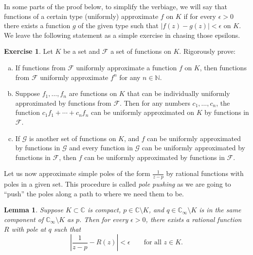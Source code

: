 \documentclass[12pt,openany]{book}
\newcommand{\sabs}[1]{\lvert {#1} \rvert}
\newcommand{\abs}[1]{\left\lvert {#1} \right\rvert}
\newcommand{\C}{{\mathbb{C}}}
\newcommand{\N}{{\mathbb{N}}}
\newcommand{\sF}{{\mathscr{F}}}
\newcommand{\sG}{{\mathscr{G}}}
\newcommand{\myindex}[1]{#1\index{#1}}
\newcommand{\myquote}[1]{``#1''}
\theoremstyle{plain}
\newtheorem{lemma}[thm]{Lemma}
\theoremstyle{remark}
\theoremstyle{definition}
\newenvironment{exbox}{%
    \def\FrameCommand{\vrule width 1pt \relax\hspace{10pt}}%
    \MakeFramed{\advance\hsize-\width\FrameRestore}%
}{%
    \endMakeFramed
}
\newenvironment{exparts}{%
    \leavevmode\begin{enumerate}[a),noitemsep,topsep=0pt,parsep=0pt,partopsep=0pt]
}{%
    \end{enumerate}
}
\theoremstyle{exercise}
\newtheorem{exercise}{Exercise}[section]
\theoremstyle{example}
\begin{document}
In some parts of the proof below, to simplify the verbiage, we will say that
functions of a certain type (uniformly) approximate $f$ on $K$
if for every $\epsilon > 0$ there exists a function $g$
of the given type such that
$\sabs{f(z)-g(z)} < \epsilon$ on $K$.  We leave the following statement as
a simple exercise in chasing those epsilons.

\begin{exbox}
\begin{exercise} \label{exercise:approxbyfamily}
Let $K$ be a set and $\sF$ a set of functions on $K$.  Rigorously prove:
\begin{exparts}
\item
If functions from $\sF$ uniformly approximate a function $f$ on $K$,
then functions from $\sF$ uniformly approximate $f^n$ for any $n \in \N$.
\item
Suppose
$f_1,\ldots,f_n$ are functions on $K$ that can be individually
uniformly approximated
by functions from $\sF$.  Then for any numbers $c_1,\ldots,c_n$, the
function $c_1 f_1 + \cdots + c_n f_n$ can be uniformly approximated on $K$
by functions in $\sF$.
\item
If $\sG$ is another set of functions on $K$, and
$f$ can be uniformly approximated by functions in $\sG$
and every function in $\sG$ can be uniformly approximated by functions in
$\sF$, then $f$ can be uniformly approximated by functions in $\sF$.
\end{exparts}
\end{exercise}
\end{exbox}

Let us now approximate simple poles of the form $\frac{1}{z-p}$ by rational
functions with poles in a given set.  This procedure is called
\emph{\myindex{pole pushing}} as we are going to \myquote{push} the poles along a
path to where we need them to be.

\begin{lemma} \label{lemma:polepushing}
Suppose $K \subset \C$ is compact,
$p \in \C \setminus K$, and
$q \in \C_{\infty} \setminus K$ is
in the same component of $\C_{\infty} \setminus K$ as $p$.
Then for every $\epsilon > 0$,
there exists a rational function $R$ with pole at $q$ such that
\begin{equation*}
\abs{\frac{1}{z-p}-R(z)} < \epsilon \qquad \text{for all $z \in K$.}
\end{equation*}
\end{lemma}
\end{document}

